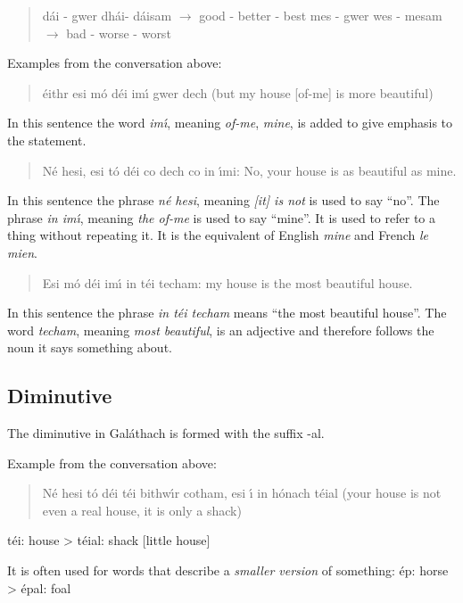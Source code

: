 \begin{quote}
d\'{a}i - gwer dh\'{a}i- d\'{a}isam $\rightarrow$ good - better - best
mes - gwer wes - mesam $\rightarrow$ bad - worse - worst
\end{quote}

Examples from the conversation above:

\begin{quote}
\'{e}ithr esi m\'{o} d\'{e}i im\'{\i} gwer dech (but my house [of-me] is more beautiful)
\end{quote}
In this sentence the word \textit{im\'{\i}}, meaning \textit{of-me}, \textit{mine}, is added to give emphasis to the statement.

\begin{quote}
N\'{e} hesi, esi t\'{o} d\'{e}i co dech co in \'{\i}mi: No, your house is as beautiful as mine.
\end{quote}
In this sentence the phrase \textit{n\'{e} hesi}, meaning \textit{[it] is not} is used to say ``no''.
The phrase \textit{in im\'{\i}}, meaning \textit{the of-me} is used to say ``mine''. It is used to refer to a thing without repeating it. It is the equivalent of English \textit{mine} and French \textit{le mien}.

\begin{quote}
Esi m\'{o} d\'{e}i im\'{\i} in t\'{e}i techam: my house is the most beautiful house.
\end{quote}
In this sentence the phrase \textit{in t\'{e}i techam} means ``the most beautiful house''. The word \textit{techam}, meaning \textit{most beautiful}, is an adjective and therefore follows the noun it says something about.

\subsection{Diminutive}

The diminutive in Gal\'{a}thach is formed with the suffix -al.

Example from the conversation above:

\begin{quote}
N\'{e} hesi t\'{o} d\'{e}i t\'{e}i bithw\'{\i}r cotham, esi \'{\i} in h\'{o}nach t\'{e}ial (your house is not even a real house, it is only a shack)
\end{quote}

t\'{e}i: house
> t\'{e}ial: shack [little house]

It is often used for words that describe a \textit{smaller version} of something:
\'{e}p: horse
> \'{e}pal: foal

